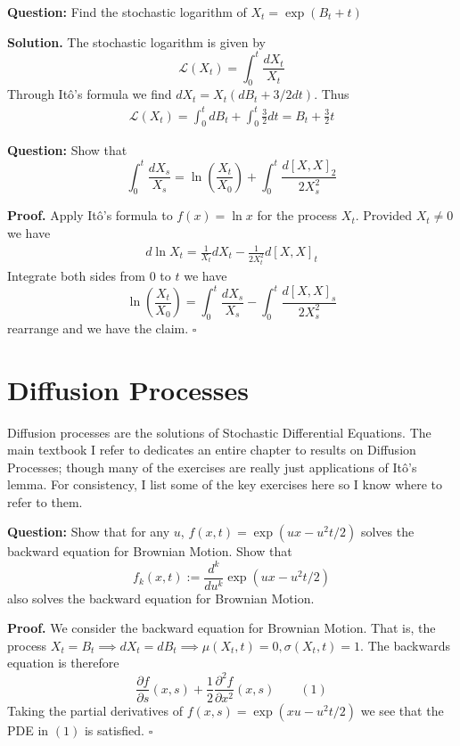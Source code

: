 \documentclass{article}
\begin{document}
\begin{tcolorbox}[colframe=black,colback=gray!5,boxrule=0.5pt]
\textbf{Question:} Find the stochastic logarithm of $X_t = \exp(B_t + t)$
\end{tcolorbox}
\textbf{Solution.} The stochastic logarithm is given by 
$$\mathcal{L}(X_t) = \int_0^t \frac{dX_t}{X_t}$$
Through Itô's formula we find $dX_t = X_t(dB_t + 3/2dt)$. Thus 
\begin{align*}
    \mathcal{L}(X_t) = \int_0^tdB_t + \int_0^t\frac{3}{2}dt = B_t + \frac{3}{2}t
\end{align*}

\begin{tcolorbox}[colframe=black,colback=gray!5,boxrule=0.5pt]
\textbf{Question:} Show that
$$\int_0^t \frac{dX_s}{X_s} = \ln\left(\frac{X_t}{X_0}\right) + \int_0^t\frac{d[X,X]_2}{2X_s^2}$$
\end{tcolorbox}
\textbf{Proof.} Apply Itô's formula to $f(x) = \ln x$ for the process $X_t$. Provided $X_t\neq0$ we have 
\begin{align*}
    d\ln X_t = \frac{1}{X_t}dX_t - \frac{1}{2X_t^2}d[X,X]_t
\end{align*}
Integrate both sides from $0$ to $t$ we have 
$$\ln\left(\frac{X_t}{X_0}\right) = \int_0^t \frac{dX_s}{X_s} - \int_0^t\frac{d[X,X]_s}{2X_s^2}$$
rearrange and we have the claim. $\square $

\newpage
\section{Diffusion Processes}

Diffusion processes are the solutions of Stochastic Differential Equations. The main textbook I refer to \cite{Fima} dedicates an entire chapter to results on Diffusion Processes; though many of the exercises are really just applications of Itô's lemma. For consistency, I list some of the key exercises here so I know where to refer to them.

\begin{tcolorbox}[colframe=black,colback=gray!5,boxrule=0.5pt]
\textbf{Question:} Show that for any $u$, $f(x,t) = \exp(ux-u^2t/2)$ solves the backward equation for Brownian Motion. Show that 
$$f_k(x,t) := \frac{d^k}{du^k}\exp(ux-u^2t/2)$$
also solves the backward equation for Brownian Motion.
\end{tcolorbox}
\textbf{Proof.} We consider the backward equation for Brownian Motion. That is, the process $X_t = B_t\implies dX_t=dB_t\implies\mu(X_t,t)=0,\sigma(X_t,t)=1$. The backwards equation is therefore
$$\frac{\partial f}{\partial s}(x,s) + \frac{1}{2}\frac{\partial^2 f}{\partial x^2}(x,s) \quad\quad (1)$$
Taking the partial derivatives of $f(x,s) = \exp(xu - u^2t/2)$ we see that the PDE in $(1)$ is satisfied. $\square$
\end{document}

